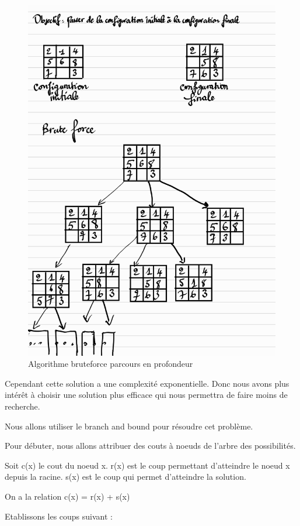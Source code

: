 \documentclass[a4paper]{article}
\begin{document}
\begin{figure}[htbp]
\centering
\includegraphics[width=.9\linewidth]{./1.jpg}
\caption{Algorithme bruteforce parcours en profondeur}
\end{figure}



Cependant cette solution a une complexité exponentielle. Donc nous avons plus intérêt à choisir une solution plus efficace qui nous permettra de faire moins de recherche.

Nous allons utiliser le branch and bound pour résoudre cet problème.

Pour débuter, nous allons attribuer des couts à noeuds de l'arbre des possibilités.

Soit c(x) le cout du noeud x. r(x) est le coup permettant d'atteindre le noeud x depuis la racine. s(x) est le coup qui permet d'atteindre la solution.

On a la relation c(x) = r(x) + s(x)

Etablissons les coups suivant :
\end{document}
